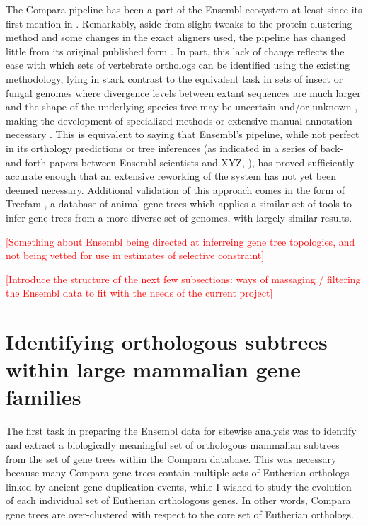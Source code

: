 The Compara pipeline has been a part of the Ensembl ecosystem at least
since its first mention in \citep{TODO}. Remarkably, aside from slight
tweaks to the protein clustering method and some changes in the exact
aligners used, the pipeline has changed little from its original
published form \citep{TODO}. In part, this lack of change reflects the
ease with which sets of vertebrate orthologs can be identified using
the existing methodology, lying in stark contrast to the equivalent
task in sets of insect or fungal genomes where divergence levels
between extant sequences are much larger \citep{TODO} and the shape of
the underlying species tree may be uncertain and/or unknown
\citep{TODO}, making the development of specialized methods or
extensive manual annotation necessary \citep{TODO}. This is equivalent
to saying that Ensembl's pipeline, while not perfect in its orthology
predictions or tree inferences (as indicated in a series of
back-and-forth papers between Ensembl scientists and XYZ,
\citep{TODO}), has proved sufficiently accurate enough that an
extensive reworking of the system has not yet been deemed
necessary. Additional validation of this approach comes in the form of
Treefam \citep{TODO}, a database of animal gene trees which applies a
similar set of tools to infer gene trees from a more diverse set of
genomes, with largely similar results.

\textcolor{red}{[Something about Ensembl being directed at inferreing gene tree topologies, and not being vetted for use in estimates of selective constraint]}

\textcolor{red}{[Introduce the structure of the next few subsections: ways of massaging / filtering the Ensembl data to fit with the needs of the current project]}

\section{Identifying orthologous subtrees within large mammalian gene families}

The first task in preparing the Ensembl data for sitewise analysis was
to identify and extract a biologically meaningful set of orthologous
mammalian subtrees from the set of gene trees within the Compara
database. This was necessary because many Compara gene trees contain
multiple sets of Eutherian orthologs linked by ancient gene
duplication events, while I wished to study the evolution of each
individual set of Eutherian orthologous genes. In other words, Compara
gene trees are over-clustered with respect to the core set of
Eutherian orthologs.

